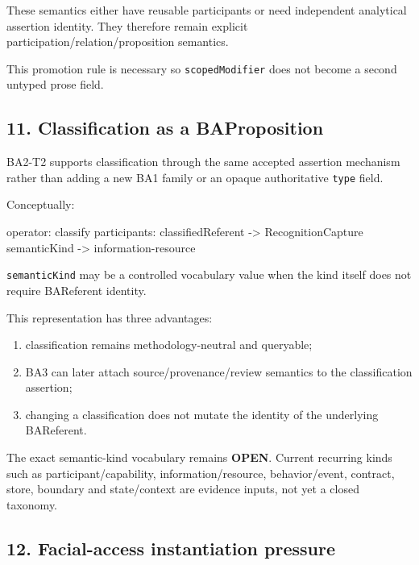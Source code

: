 \documentclass[
  10pt,
  letterpaper,
]{article}
\newenvironment{Shaded}{}{}
\newcommand{\NormalTok}[1]{#1}
\providecommand{\tightlist}{%
  \setlength{\itemsep}{0pt}\setlength{\parskip}{0pt}}
\begin{document}
These semantics either have reusable participants or need independent
analytical assertion identity. They therefore remain explicit
participation/relation/proposition semantics.

This promotion rule is necessary so \texttt{scopedModifier} does not
become a second untyped prose field.

\subsection{11. Classification as a
BAProposition}\label{classification-as-a-baproposition}

BA2-T2 supports classification through the same accepted assertion
mechanism rather than adding a new BA1 family or an opaque authoritative
\texttt{type} field.

Conceptually:

\begin{Shaded}
\begin{Highlighting}[]
\NormalTok{operator: classify}
\NormalTok{participants:}
\NormalTok{  classifiedReferent {-}\textgreater{} RecognitionCapture}
\NormalTok{  semanticKind       {-}\textgreater{} information{-}resource}
\end{Highlighting}
\end{Shaded}

\texttt{semanticKind} may be a controlled vocabulary value when the kind
itself does not require BAReferent identity.

This representation has three advantages:

\begin{enumerate}
\def\labelenumi{\arabic{enumi}.}
\tightlist
\item
  classification remains methodology-neutral and queryable;
\item
  BA3 can later attach source/provenance/review semantics to the
  classification assertion;
\item
  changing a classification does not mutate the identity of the
  underlying BAReferent.
\end{enumerate}

The exact semantic-kind vocabulary remains \textbf{OPEN}. Current
recurring kinds such as participant/capability, information/resource,
behavior/event, contract, store, boundary and state/context are evidence
inputs, not yet a closed taxonomy.

\subsection{12. Facial-access instantiation
pressure}\label{facial-access-instantiation-pressure}
\end{document}
